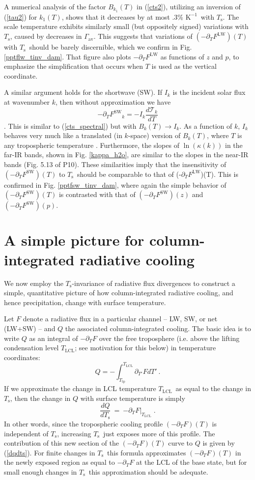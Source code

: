 \documentclass[10pt]{article}
\newcommand{\beqn}{\begin{equation}}
\newcommand{\eeqn}{\end{equation}}
\newcommand{\eqnref}[1]{(\ref{#1})}
\newcommand{\n}{\nonumber}
\newcommand{\der}[2]{\ensuremath{\frac{d #1}{d #2}}}
\newcommand{\ppt}{\ensuremath{\partial_T}}
\newcommand{\FLW}{\ensuremath{F^\mathrm{LW}}}
\newcommand{\FSW}{\ensuremath{F^\mathrm{SW}}}
\newcommand{\trans}{\ensuremath{\mathcal{T}}}
\newcommand{\pierre}{P10}
\newcommand{\Ts}{\ensuremath{T_\mathrm{s}}}
\newcommand{\Tlcl}{\ensuremath{T_\mathrm{LCL}}}
\newcommand{\Ttp}{\ensuremath{T_\mathrm{tp}}}
\newcommand{\gammaav}{\ensuremath{\Gamma_\mathrm{av}}}
\newcommand{\Kinverse}{\ensuremath{\mathrm{K^{-1}}}}
\begin{document}
 	A numerical analysis of the factor $B_{k_1}(T)$ in \eqnref{cts2}, utilizing an inversion of \eqnref{tau2} for $k_1(T)$, shows that it decreases by at most .3\% \Kinverse\ with \Ts. The scale temperature exhibits similarly small (but oppositely signed) variations with \Ts, caused by decreases in \gammaav. This suggests that variations of $(-\ppt \FLW)(T)$ with \Ts\ should be barely discernible, which we confirm in Fig.  \ref{pptflw_tinv_dam}. That figure also plots 
$-\ppt \FLW$ as functions of $z$ and $p$, to emphasize the simplification that occurs when $T$ is used as the vertical coordinate.

A similar argument holds for the shortwave (SW). If $I_k$ is the incident solar flux at wavenumber $k$, then without approximation we have
	\beqn
		-\ppt \FSW_k = - I_k \der{\trans_k}{T}
		\n
	\eeqn
\citep[c.f.][eqn. 9.26]{thomas2002}. This is similar to  \eqnref{cts_spectral} but with $B_k(T) \rightarrow I_k$. As a function of $k$, $I_k$ behaves very much like a translated (in $k$-space) version of  $B_k(T)$,  where $T$ is any tropospheric temperature  \citep[cf. Fig. 3.2 of][]{hartmann1994book}. Furthermore, the slopes of $\ln(\kappa(k))$ in the far-IR bands, shown in Fig. \ref{kappa_h2o}, are similar to the slopes in the near-IR bands (Fig. 5.13 of \pierre). These similarities imply that the insensitivity of $(-\ppt \FSW)(T)$ to \Ts\ should be comparable to that of  (-\ppt \FLW)(T).
 This is confirmed in Fig. \ref{pptfsw_tinv_dam}, where again the simple behavior of $(-\ppt \FSW)(T)$ is contrasted with that of $(-\ppt \FSW)(z)$ and $(-\ppt \FSW)(p)$.


		
\section{A simple picture for column-integrated radiative cooling}
	We now employ the \Ts-invariance of radiative flux divergences  to construct a simple, quantitative picture of how column-integrated radiative cooling, and hence precipitation,  change with surface temperature. 
	
	Let $F$ denote a radiative flux in a particular channel -- LW, SW, or net (LW+SW) -- and $Q$ the associated column-integrated cooling. The basic idea is to write $Q$ as an integral of $-\ppt F$ over the free troposphere (i.e. above the lifting condensation level \Tlcl; see motivation for this below) in temperature coordinates: 
	\beqn
		Q = - \int_{\Ttp}^{\Tlcl} \partial_{T'} F dT' \ . 
		\n
	\eeqn
  If we approximate the change in LCL temperature \Tlcl\ as equal to the change in \Ts, then the change in $Q$ with surface temperature is  simply
	\beqn
		\der{Q}{\Ts} \ =\  \left.  -\ppt F\right|_{\Tlcl}  \; .
	\label{dqdts}
	\eeqn
In other words, since the tropospheric cooling profile $(-\ppt F)(T)$  is independent of \Ts, increasing \Ts\ just exposes more of this profile.  The contribution of this new section of the $(-\ppt F)(T)$ curve to $Q$ is given by \eqnref{dqdts}.  For finite changes in \Ts\ this formula approximates $(-\ppt F)(T)$ in the newly exposed region as equal to $-\ppt F$ at the LCL of the base state, but for small enough changes in \Ts\ this approximation should be adequate.
\end{document}
